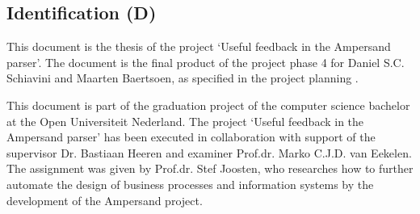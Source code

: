 
\subsection{Identification (D)}
This document is the thesis of the project `Useful feedback in the Ampersand parser'.
The document is the final product of the project phase 4 for Daniel S.C. Schiavini and Maarten Baertsoen, as specified in the project planning .

This document is part of the graduation project of the computer science bachelor at the Open Universiteit Nederland.
The project `Useful feedback in the Ampersand parser' has been executed in collaboration with support of the supervisor Dr. Bastiaan Heeren and examiner Prof.dr. Marko C.J.D. van Eekelen.
The assignment was given by Prof.dr. Stef Joosten, who researches how to further automate the design of business processes and information systems by the development of the Ampersand project.
